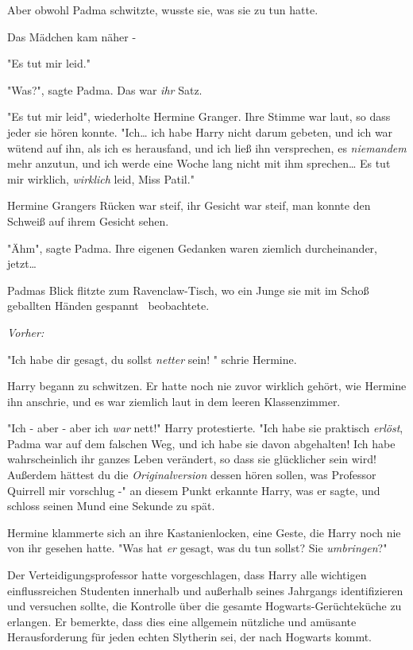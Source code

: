 {Aber obwohl Padma schwitzte, wusste sie, was sie zu tun hatte.

Das Mädchen kam näher -

"Es tut mir leid."

"Was?", sagte Padma. Das war \emph{ihr} Satz.

"Es tut mir leid", wiederholte Hermine Granger. Ihre Stimme war laut, so dass jeder sie hören konnte. "Ich… ich habe Harry nicht darum gebeten, und ich war wütend auf ihn, als ich es herausfand, und ich ließ ihn versprechen, es \emph{niemandem} mehr anzutun, und ich werde eine Woche lang nicht mit ihm sprechen… Es tut mir wirklich, \emph{wirklich} leid, Miss Patil."

Hermine Grangers Rücken war steif, ihr Gesicht war steif, man konnte den Schweiß auf ihrem Gesicht sehen.

"Ähm", sagte Padma. Ihre eigenen Gedanken waren ziemlich durcheinander, jetzt…

Padmas Blick flitzte zum Ravenclaw-Tisch, wo ein Junge sie mit im Schoß geballten Händen gespannt ~beobachtete.

\emph{Vorher:}

"Ich habe dir gesagt, du sollst \emph{netter} sein! " schrie Hermine.

Harry begann zu schwitzen. Er hatte noch nie zuvor wirklich gehört, wie Hermine ihn anschrie, und es war ziemlich laut in dem leeren Klassenzimmer.

"Ich - aber - aber ich \emph{war} nett!" Harry protestierte. "Ich habe sie praktisch \emph{erlöst}, Padma war auf dem falschen Weg, und ich habe sie davon abgehalten! Ich habe wahrscheinlich ihr ganzes Leben verändert, so dass sie glücklicher sein wird! Außerdem hättest du die \emph{Originalversion} dessen hören sollen, was Professor Quirrell mir vorschlug -" an diesem Punkt erkannte Harry, was er sagte, und schloss seinen Mund eine Sekunde zu spät.

Hermine klammerte sich an ihre Kastanienlocken, eine Geste, die Harry noch nie von ihr gesehen hatte. "Was hat \emph{er} gesagt, was du tun sollst? Sie \emph{umbringen}?"

Der Verteidigungsprofessor hatte vorgeschlagen, dass Harry alle wichtigen einflussreichen Studenten innerhalb und außerhalb seines Jahrgangs identifizieren und versuchen sollte, die Kontrolle über die gesamte Hogwarts-Gerüchteküche zu erlangen. Er bemerkte, dass dies eine allgemein nützliche und amüsante Herausforderung für jeden echten Slytherin sei, der nach Hogwarts kommt.

}
